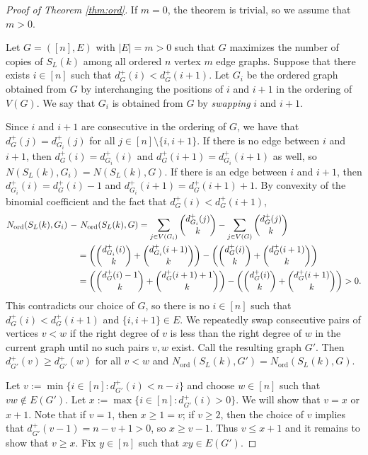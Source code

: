 \documentclass[11pt]{article}
\let\originalleft\left
\let\originalright\right
\renewcommand{\left}{\mathopen{}\mathclose\bgroup\originalleft}
\renewcommand{\right}{\aftergroup\egroup\originalright}
\newcommand{\ord}{{\operatorname{ord}}}
\theoremstyle{definition}
\newcommand{\paren}[1]{\left( #1 \right)}
\begin{document}
\begin{proof}[Proof of Theorem \ref{thm:ord}]
    If $m=0$, the theorem is trivial, so we assume that $m >0$.

    Let $G=([n], E)$ with $|E|=m>0$ such that $G$ maximizes the number of copies of $S_L (k)$ among all ordered $n$ vertex $m$ edge graphs. Suppose that there exists $i \in [n]$ such that $d^+_G (i) < d^+_G (i+1)$.
    Let $G_i$ be the ordered graph obtained from $G$ by interchanging the positions of $i$ and $i+1$ in the ordering of $V(G)$. We say that $G_i$ is obtained from $G$ by {\em swapping} $i$ and $i+1$. 
   
    Since $i$ and $i+1$ are consecutive in the ordering of $G$, we have that $d_G^+ (j) = d_{G_i}^+ (j)$ for all $j \in [n] \setminus \{ i, i+1\}$. If there is no edge between $i$ and $i+1$, then $d_G^+ (i) = d_{G_i}^+ (i)$ and $d_G^+ (i+1) = d_{G_i}^+ (i+1)$ as well, so  $N(S_L (k), G_i)=N(S_L(k), G)$. If there is an edge between $i$ and $i+1$, then $d_{G_i}^+(i)=d_G^+(i)-1$ and $d_{G_i}^+(i+1)=d_G^+(i+1)+1$. By convexity of the binomial coefficient and the fact that $d_G^+ (i) < d_G^+ (i+1)$, \begin{align*}
        N_\ord (S_L (k), G_i) ~ -& ~ N_\ord (S_L (k), G) = \sum_{j \in V(G_i)} \binom{d_{G_i}^+ (j)}{k} - \sum_{j \in V(G)} \binom{d_G^+ (j)}{k} \\
        &= \paren{\binom{d_{G_i}^+ (i)}{k} + \binom{d_{G_i}^+ (i + 1)}{k}} - \paren{\binom{d_G^+ (i)}{k} + \binom{d_G^+ (i + 1)}{k}} \\
        &= \paren{\binom{d_G^+ (i) - 1}{k} + \binom{d_G^+ (i + 1)+ 1}{k}} - \paren{\binom{d_G^+ (i)}{k} + \binom{d_G^+ (i + 1)}{k}} > 0.
    \end{align*} This contradicts our choice of $G$, so there is no $i \in [n]$ such that $d_G^+ (i) < d_G^+ (i+1)$ and $\{i,i+1\} \in E$.  We repeatedly swap consecutive pairs of vertices $v< w$ if the right degree of $v$ is less than the right degree of $w$ in the current graph until no such pairs $v,w$ exist. Call the resulting graph $G'$. Then  $d^+_{G'} (v)  \ge d^+_{G'} (w)$ for all $v<w$ and $N_\ord (S_L (k), G') = N_\ord (S_L (k), G)$.
    
    Let $v := \min \{ i \in [n] : d_{G'}^+ (i) < n - i \}$ and choose  $w\in [n]$  such that $vw \not\in E(G')$.
    Let $x := \max \{ i\in [n] : d^+_{G'} (i) > 0 \}$.  We will show that $v=x$ or $x+1$. Note that if $v = 1$, then $x\ge 1 = v$; if $v\ge 2$, then the choice of $v$ implies that $d^+_{G'} (v-1) = n - v + 1 >0$, so $x \ge v-1$. Thus $v \le x+1$ and it remains to show that $v \geq x$. Fix $y\in [n]$ such that $xy \in E (G')$.
    

\end{proof}
\end{document}
